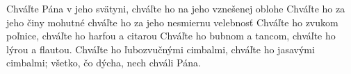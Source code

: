 Chváľte Pána v jeho svätyni,
chváľte ho na jeho vznešenej oblohe
\versseparator
Chváľte ho za jeho činy mohutné
chváľte ho za jeho nesmiernu velebnosť
\versseparator
Chváľte ho zvukom poľnice,
chváľte ho harfou a citarou
\versseparator
Chváľte ho bubnom a tancom,
chváľte ho lýrou a flautou.
\versseparator
Chváľte ho ľubozvučnými cimbalmi,
chváľte ho jasavými cimbalmi;
všetko, čo dýcha, nech chváli Pána.
